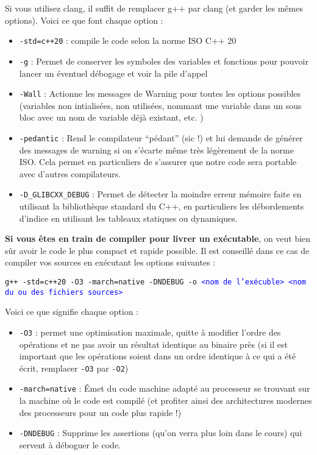Si vous utilisez clang, il suffit de remplacer g++ par clang (et garder les mêmes options). Voici ce que font chaque option :
\begin{itemize}
    \item \texttt{-std=c++20} : compile le code selon la norme ISO C++ 20
    \item \texttt{-g} : Permet de conserver les symboles des variables et fonctions pour pouvoir lancer un éventuel débogage et voir la pile d'appel
    \item \texttt{-Wall} : Actionne les messages de Warning pour toutes les options possibles (variables non intialisées, non utilisées, nommant une variable dans un sous bloc avec un nom de variable déjà existant, etc. )
    \item \texttt{-pedantic} : Rend le compilateur ``pédant'' (sic !) et lui demande de générer des messages de warning si on
    s'écarte même très légèrement de la norme ISO. Cela permet en particuliers de s'assurer que notre code sera portable avec
    d'autres compilateurs.
    \item \texttt{-D\_GLIBCXX\_DEBUG} : Permet de détecter la moindre erreur mémoire faite en utilisant la bibliothèque standard du C++, en particuliers les débordements d'indice en utilisant les tableaux statiques ou dynamiques.
\end{itemize}

\textbf{Si vous êtes en train de compiler pour livrer un exécutable}, on veut bien sûr avoir le code le plus compact et rapide possible. Il est conseillé dans ce cas de compiler vos sources en exécutant les options suivantes :

\texttt{g++ -std=c++20 -O3 -march=native -DNDEBUG -o \textcolor{blue}{<nom de l'exécuble> <nom du  ou des fichiers sources>}}

Voici ce que signifie chaque option :
\begin{itemize}
    \item \texttt{-O3} : permet une optimisation maximale, quitte à modifier l'ordre des opérations et ne pas avoir un résultat identique au binaire près (si il est important que les opérations soient dans un ordre identique à ce qui a été écrit, remplacer \texttt{-O3} par \texttt{-O2})
    \item \texttt{-march=native} : \'Emet du code machine adapté au processeur se trouvant sur la machine où le code est compilé (et profiter ainsi des architectures modernes des processeurs pour un code plus rapide !)
    \item \texttt{-DNDEBUG} : Supprime les assertions (qu'on verra plus loin dans le cours) qui servent à déboguer le code.
\end{itemize}

